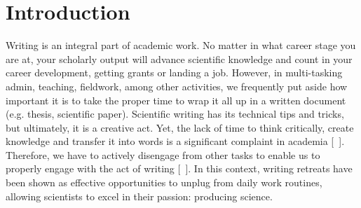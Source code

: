\documentclass[10pt,letterpaper]{article}
\begin{document}



\linenumbers

\section*{Introduction}

Writing is an integral part of academic work. No matter in what career stage you are at, your scholarly output will advance scientific knowledge and count in your career development, getting grants or landing a job. However, in multi-tasking admin, teaching, fieldwork, among other activities, we frequently put aside how important it is to take the proper time to wrap it all up in a written document (e.g. thesis, scientific paper). Scientific writing has its technical tips and tricks, but ultimately, it is a creative act. Yet, the lack of time to think critically, create knowledge and transfer it into words is a significant complaint in academia [~\cite{menzies}]. Therefore, we have to actively disengage from other tasks to enable us to properly engage with the act of writing [~\cite{murray2013}]. In this context, writing retreats have been shown as effective opportunities to unplug from daily work routines, allowing scientists to excel in their passion: producing science.
\end{document}
